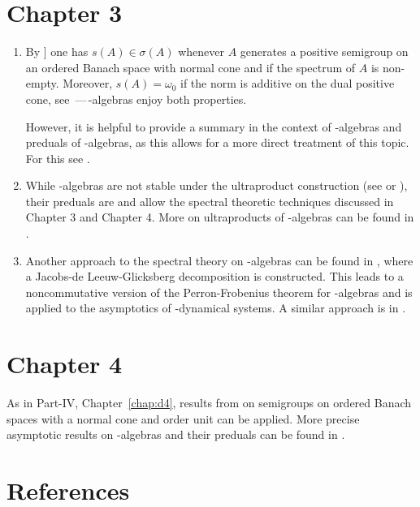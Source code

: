 \section*{Chapter 3}
\begin{enumerate}
\item 
By \textcite[Theorem 5.3.1]{zbmath03736445}] one has $s(A) \in \sigma(A)$ whenever $A$ generates a positive semigroup on an ordered Banach space with normal cone and if the spectrum of $A$ is non-empty.
Moreover, $s(A) = \omega_{0}$ if the norm is additive on the dual positive cone, see \textcite[Theorem 2.4.4]{zbmath03883065}\,---\,\CA-algebras enjoy both properties.

However, it is helpful to provide a summary in the context of \CA-algebras and preduals of \WA-algebras, as this allows for a more direct treatment of this topic.
For this see \textcite{groh:2026}.


\item 
While \WA-algebras are not stable under the ultraproduct construction (see \textcite[p. 79]{zbmath03640303} or \textcite{zbmath03467832}), their preduals are and allow the spectral theoretic techniques discussed in Chapter 3 and Chapter 4.
More on ultraproducts of \WA-algebras can be found in \textcite{zbmath06326930}.

\item 
Another approach to the spectral theory on \WA-algebras can be found in \textcite{zbmath06031834}, where a Jacobs-de Leeuw-Glicksberg decomposition is constructed.
This leads to a noncommutative version of the Perron-Frobenius theorem for \WA-algebras and is applied to the asymptotics of \WA-dynamical systems.
A similar approach is in \textcite{zbmath06728793}.

\end{enumerate}
\section*{Chapter 4}
As in Part-IV, Chapter~\ref{chap:d4},  results from \textcite{zbmath07964911} on semigroups on ordered Banach spaces with a normal cone and order unit can be applied. 
More precise asymptotic results on \WA-algebras and their preduals can be found in \textcite{zbmath02244715}.
\section*{References}
{\RaggedRight
  \printbibliography[heading=none]
 }